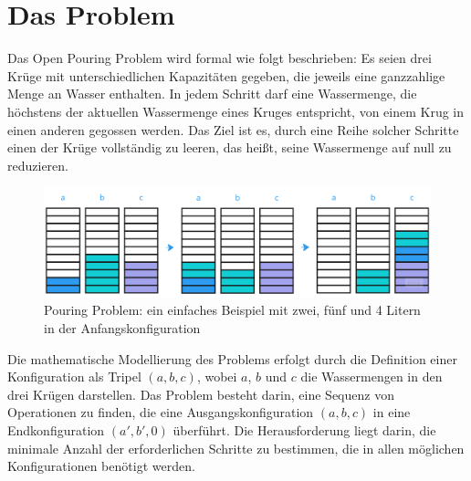 \chapter{Das Problem}
Das Open Pouring Problem wird formal wie folgt beschrieben: Es seien drei Krüge mit unterschiedlichen Kapazitäten gegeben, die jeweils eine ganzzahlige Menge an Wasser enthalten. 
In jedem Schritt darf eine Wassermenge, die höchstens der aktuellen Wassermenge eines Kruges entspricht, von einem Krug in einen anderen gegossen werden. Das Ziel ist es, durch eine Reihe solcher Schritte einen der Krüge vollständig zu leeren, das heißt, seine Wassermenge auf null zu reduzieren.

\begin{figure}[H]
    \centering
    \includegraphics[page=1, width=1\textwidth]{./bilder/Pouring_Problem_1.png} 
    \caption{Pouring Problem: ein einfaches Beispiel mit zwei, fünf und 4 Litern in der Anfangskonfiguration} 
    \label{fig:pouring_problem_die_hard}
\end{figure}

Die mathematische Modellierung des Problems erfolgt durch die Definition einer Konfiguration als Tripel $(a, b, c)$, wobei $a$, $b$ und $c$ die Wassermengen in den drei Krügen darstellen. Das Problem besteht darin, eine Sequenz von Operationen zu finden, die eine Ausgangskonfiguration $(a, b, c)$ in eine Endkonfiguration $(a', b', 0)$ überführt. Die Herausforderung liegt darin, die minimale Anzahl der erforderlichen Schritte zu bestimmen, die in allen möglichen Konfigurationen benötigt werden. \\

\autocite{Frei.2020} %
